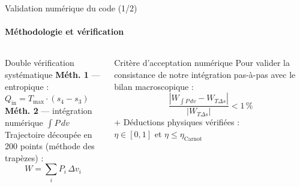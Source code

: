 \documentclass[aspectratio=43, 10pt]{beamer}
\newcommand{\Tmax}{T_{\max}}
\newcommand{\etaC}{\eta_{\text{Carnot}}}
\newcommand{\Qin}{Q_{\text{in}}}
\begin{document}
\begin{frame}{Validation num\'erique du code (1/2)}
  \framesubtitle{M\'ethodologie et v\'erification}

  \begin{columns}[T,onlytextwidth]
      \begin{block}{Double v\'erification syst\'ematique}
        \normalsize
        \textbf{M\'eth. 1} --- entropique :\\[2pt]
        \( \Qin = \Tmax\cdot(s_4-s_3) \)\\[8pt]
        \textbf{M\'eth. 2} --- int\'egration num\'erique $\int P\,dv$\\[2pt]
        Trajectoire d\'ecoup\'ee en 200 points (m\'ethode des trap\`ezes) :
        \[
          W = \sum_i P_i\,\Delta v_i
        \]
      \end{block}

      \begin{alertblock}{Crit\`ere d'acceptation num\'erique}
        \normalsize
        Pour valider la consistance de notre int\'egration pas-\`a-pas avec le bilan macroscopique :
        \[
          \frac{|W_{\int P\,dv} - W_{T\Delta s}|}{|W_{T\Delta s}|}
          < 1\,\%
        \]
        \vspace{1em}
        + D\'eductions physiques v\'erifi\'ees :\\[4pt]
        $\eta \in [0,1]$ et $\eta \leq \etaC$
      \end{alertblock}
  \end{columns}
\end{frame}
\end{document}
